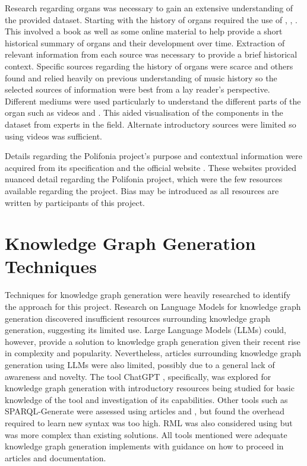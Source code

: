 Research regarding organs was necessary to gain an extensive understanding of the provided dataset. Starting with the history of organs required the use of \cite{organhistory}, \cite{organhistory1}, \cite{organmedivalhistory}. This involved a book as well as some online material to help provide a short historical summary of organs and their development over time. Extraction of relevant information from each source was necessary to provide a brief historical context. Specific sources regarding the history of organs were scarce and others found \cite{apel1948early} and \cite{ochse1988history} relied heavily on previous understanding of music history so the selected sources of information were best from a lay reader's perspective. Different mediums were used particularly to understand the different parts of the organ such as videos \cite{organvideo} and \cite{organvideo1}. This aided visualisation of the components in the dataset from experts in the field. Alternate introductory sources were limited so using videos was sufficient. 

Details regarding the Polifonia project's purpose and contextual information were acquired from its specification \cite{polifoniaproject} and the official website \cite{polifonia}. These websites provided nuanced detail regarding the Polifonia project, which were the few resources available regarding the project. Bias may be introduced as all resources are written by participants of this project. 

\section{Knowledge Graph Generation Techniques}
\hspace{0.5cm} Techniques for knowledge graph generation were heavily researched to identify the approach for this project. Research on Language Models for knowledge graph generation discovered insufficient resources surrounding knowledge graph generation, suggesting its limited use. Large Language Models (LLMs) \cite{rouse_2023} could, however, provide a solution to knowledge graph generation given their recent rise in complexity and popularity. Nevertheless, articles surrounding knowledge graph generation using LLMs were also limited, possibly due to a general lack of awareness and novelty. The tool ChatGPT \cite{chatgptwebsite}, specifically, was explored for knowledge graph generation with introductory resources \cite{chatgpt} being studied for basic knowledge of the tool and investigation of its capabilities. Other tools such as SPARQL-Generate \cite{sparqlgenerate} were assessed using articles \cite{lefranccois2017flexible} and \cite{lefranccois2017sparql}, but found the overhead required to learn new syntax was too high. RML \cite{rml} was also considered using \cite{dimou2014rml} but was more complex than existing solutions. All tools mentioned were adequate knowledge graph generation implements with guidance on how to proceed in articles and documentation. 

